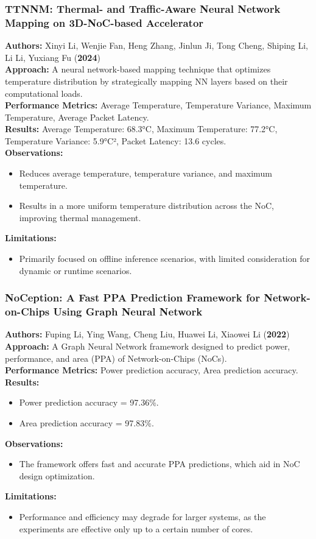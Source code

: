 \documentclass{beamer}
\begin{document}
\begin{frame}[fragile]
\frametitle{TTNNM: Thermal- and Traffic-Aware Neural Network Mapping on 3D-NoC-based Accelerator}

\small
\textbf{Authors:} Xinyi Li, Wenjie Fan, Heng Zhang, Jinlun Ji, Tong Cheng, Shiping Li, Li Li, Yuxiang Fu (\textbf{2024}) \\
\textbf{Approach:} A neural network-based mapping technique that optimizes temperature distribution by strategically mapping NN layers based on their computational loads. \\
\textbf{Performance Metrics:} Average Temperature, Temperature Variance, Maximum Temperature, Average Packet Latency. \\
\textbf{Results:} Average Temperature: 68.3°C, Maximum Temperature: 77.2°C, Temperature Variance: 5.9°C², Packet Latency: 13.6 cycles. \\
\textbf{Observations:} 
\begin{itemize}
    \item Reduces average temperature, temperature variance, and maximum temperature.
    \item Results in a more uniform temperature distribution across the NoC, improving thermal management.
\end{itemize}
\textbf{Limitations:} 
\begin{itemize}
    \item Primarily focused on offline inference scenarios, with limited consideration for dynamic or runtime scenarios.
\end{itemize}
\end{frame}

\begin{frame}[fragile]
\frametitle{NoCeption: A Fast PPA Prediction Framework for Network-on-Chips Using Graph Neural Network}

\small
\textbf{Authors:} Fuping Li, Ying Wang, Cheng Liu, Huawei Li, Xiaowei Li (\textbf{2022}) \\
\textbf{Approach:} A Graph Neural Network framework designed to predict power, performance, and area (PPA) of Network-on-Chips (NoCs). \\
\textbf{Performance Metrics:} Power prediction accuracy, Area prediction accuracy. \\
\textbf{Results:} 
\begin{itemize}
    \item Power prediction accuracy = 97.36\%.
    \item Area prediction accuracy = 97.83\%.
\end{itemize}
\textbf{Observations:} 
\begin{itemize}
    \item The framework offers fast and accurate PPA predictions, which aid in NoC design optimization.
\end{itemize}
\textbf{Limitations:} 
\begin{itemize}
    \item Performance and efficiency may degrade for larger systems, as the experiments are effective only up to a certain number of cores.
\end{itemize}
\end{frame}
\end{document}
